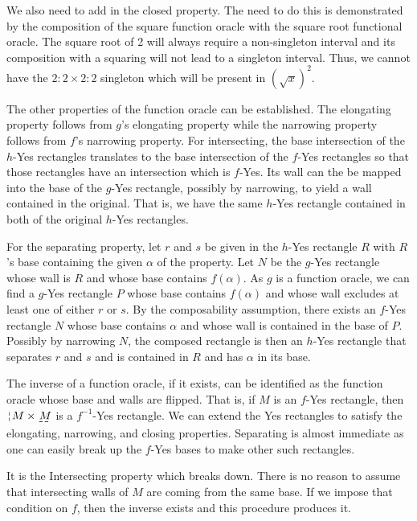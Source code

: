 \documentclass[12pt]{article}
\begin{document}
We also need to add in the closed property. The need to do this is demonstrated by the composition of the square function oracle with the square root functional oracle. The square root of 2 will always require a non-singleton interval and its composition with a squaring will not lead to a singleton interval. Thus, we cannot have the $2:2 \times 2:2$ singleton which will be present in $(\sqrt{x})^2$.

The other properties of the function oracle can be established. The elongating property follows from $g$'s elongating property while the narrowing property follows from $f$'s narrowing property. For intersecting, the base intersection of the $h$-Yes rectangles translates to the base intersection of the $f$-Yes rectangles so that those rectangles have an intersection which is $f$-Yes. Its wall can the be mapped into the base of the $g$-Yes rectangle, possibly by narrowing, to yield a wall contained in the original. That is, we have the same $h$-Yes rectangle contained in both of the original $h$-Yes rectangles. 

For the separating property, let $r$ and $s$ be given in the $h$-Yes rectangle $R$ with $R$'s base containing the given $\alpha$ of the property. Let $N$ be the $g$-Yes rectangle whose wall is $R$ and whose base contains $f(\alpha)$. As $g$ is a function oracle, we can find a $g$-Yes rectangle $P$ whose base contains $f(\alpha)$ and whose wall excludes at least one of either $r$ or $s$. By the composability assumption, there exists an $f$-Yes rectangle $N$ whose base contains $\alpha$  and whose wall is contained in the base of $P$. Possibly by narrowing $N$, the composed rectangle is then an $h$-Yes rectangle that separates $r$ and $s$ and is contained in $R$ and has $\alpha$ in its base. 


The inverse of a function oracle, if it exists, can be identified as the function oracle whose base and walls are flipped. That is, if $M$ is an $f$-Yes rectangle, then $\wall{M} \times \base{M}$ is a $f^{-1}$-Yes rectangle. We can extend the Yes rectangles to satisfy the elongating, narrowing, and closing properties. Separating is almost immediate as one can easily break up the $f$-Yes bases to make other such rectangles.

It is the Intersecting property which breaks down. There is no reason to assume that intersecting walls of $M$ are coming from the same base. If we impose that condition on $f$, then the inverse exists and this procedure produces it. 
\end{document}
